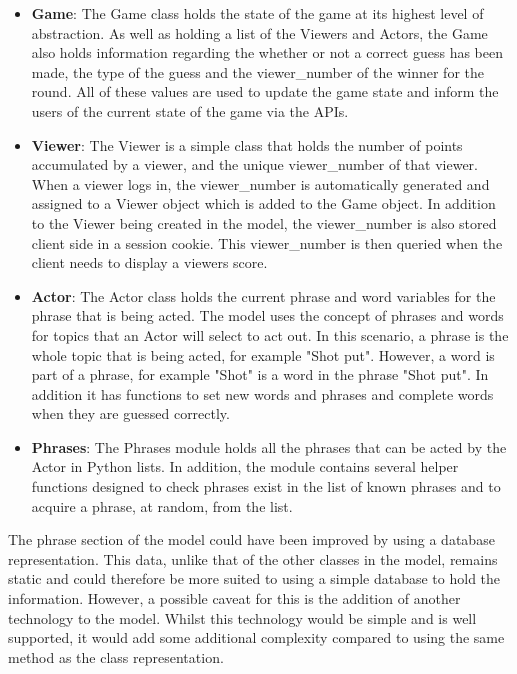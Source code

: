 \begin{itemize}
	\item \textbf{Game}: The Game class holds the state of the game at its highest level of abstraction. As well as holding a list of the Viewers and Actors, the Game also holds information regarding the whether or not a correct guess has been made, the type of the guess and the viewer\_number of the winner for the round. All of these values are used to update the game state and inform the users of the current state of the game via the APIs.
	
	\item \textbf{Viewer}: The Viewer is a simple class that holds the number of points accumulated by a viewer, and the unique viewer\_number of that viewer. When a viewer logs in, the viewer\_number is automatically generated and assigned to a Viewer object which is added to the Game object. In addition to the Viewer being created in the model, the viewer\_number is also stored client side in a session cookie. This viewer\_number is then queried when the client needs to display a viewers score. 
	
	\item \textbf{Actor}: The Actor class holds the current phrase and word variables for the phrase that is being acted. The model uses the concept of phrases and words for topics that an Actor will select to act out. In this scenario, a phrase is the whole topic that is being acted, for example "Shot put". However, a word is part of a phrase, for example "Shot" is a word in the phrase "Shot put". In addition it has functions to set new words and phrases and complete words when they are guessed correctly.
	
	\item \textbf{Phrases}: The Phrases module holds all the phrases that can be acted by the Actor in Python lists. In addition, the module contains several helper functions designed to check phrases exist in the list of known phrases and to acquire a phrase, at random, from the list.
	
\end{itemize}

The phrase section of the model could have been improved by using a database representation. This data, unlike that of the other classes in the model, remains static and could therefore be more suited to using a simple database to hold the information. However, a possible caveat for this is the addition of another technology to the model. Whilst this technology would be simple and is well supported, it would add some additional complexity compared to using the same method as the class representation.

